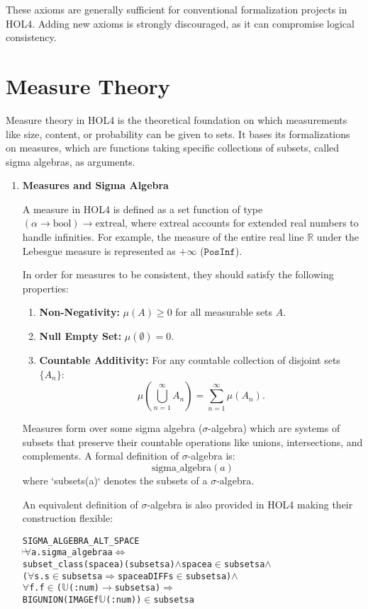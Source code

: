 These axioms are generally sufficient for conventional formalization projects in HOL4. Adding new axioms is strongly discouraged, as it can compromise logical consistency.


\section{Measure Theory}

Measure theory in HOL4 is the theoretical foundation on which measurements like size, content, or probability can be given to sets. It bases its formalizations on measures, which are functions taking specific collections of subsets, called sigma algebras, as arguments.


\begin{enumerate}
    \item \textbf{Measures and Sigma Algebra}

    A measure in HOL4 is defined as a set function of type \((\alpha \to \text{bool}) \to \text{extreal}\), where \(\text{extreal}\) accounts for extended real numbers to handle infinities. For example, the measure of the entire real line \(\mathbb{R}\) under the Lebesgue measure is represented as \(+\infty\) (\(\texttt{PosInf}\)).

    In order for measures to be consistent, they should satisfy the following properties:
    \begin{enumerate}
        \item \textbf{Non-Negativity:} \(\mu(A) \geq 0\) for all measurable sets \(A\).
        \item \textbf{Null Empty Set:} \(\mu(\emptyset) = 0\).
        \item \textbf{Countable Additivity:} For any countable collection of disjoint sets \(\{A_n\}\):
   \[
   \mu\left(\bigcup_{n=1}^\infty A_n\right) = \sum_{n=1}^\infty \mu(A_n).
   \]
    \end{enumerate}
    Measures form over some sigma algebra (\(\sigma\)-algebra) which are systems of subsets that preserve their countable operations like unions, intersections, and complements. A formal definition of \(\sigma\)-algebra is:
\[
\text{sigma\_algebra}(a)
\]
where `subsets(a)` denotes the subsets of a \(\sigma\)-algebra.

An equivalent definition of \(\sigma\)-algebra is also provided in HOL4 making their construction flexible:
\begin{hol}
  \begin{alltt}
    SIGMA_ALGEBRA_ALT_SPACE
    \(\!\!\!{\turn}\!\!\!\!\) \(\forall\)a. sigma_algebra a \({\Leftrightarrow}\)
    subset_class (space a) (subsets a) \(\land\) space a \(\in\) subsets a \(\land\)
    (\(\forall\)s. s \(\in\) subsets a \(\Rightarrow\) space a DIFF s \(\in\) subsets a) \(\land\)
    \(\forall\)f. f \(\in\) (\(\mathbb{U}\)(:num) \(\to\) subsets a) \(\Rightarrow\)
    BIGUNION (IMAGE f \(\mathbb{U}\)(:num)) \(\in\) subsets a
  \end{alltt}
\end{hol}


\end{enumerate}
